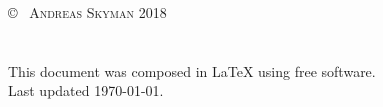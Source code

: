 
    \vspace*{\fill}
    \noindent
    \copyright ~ \textsc{Andreas Skyman 2018}\\[4ex]
    \\
    \footnotesize{
    \CcNote{\CcLongnameBySa}\\
    This document was composed in \LaTeX{} using free software. \\
    Last updated \today.
    }
    \normalsize
    \thispagestyle{empty}
    \newpage

